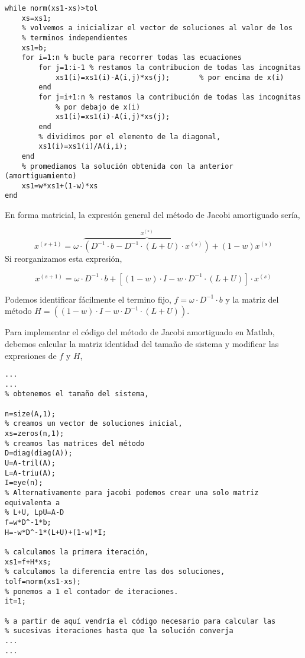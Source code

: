 \begin{lstlisting}
while norm(xs1-xs)>tol
 	xs=xs1;
    % volvemos a inicializar el vector de soluciones al valor de los
    % terminos independientes
    xs1=b; 
    for i=1:n % bucle para recorrer todas las ecuaciones
        for j=1:i-1 % restamos la contribucion de todas las incognitas
            xs1(i)=xs1(i)-A(i,j)*xs(j);       % por encima de x(i)
        end
        for j=i+1:n % restamos la contribución de todas las incognitas
            % por debajo de x(i)
            xs1(i)=xs1(i)-A(i,j)*xs(j);
        end
        % dividimos por el elemento de la diagonal,
        xs1(i)=xs1(i)/A(i,i);
    end
    % promediamos la solución obtenida con la anterior (amortiguamiento)
    xs1=w*xs1+(1-w)*xs
end
\end{lstlisting}

En forma matricial, la expresión general del método de Jacobi amortiguado sería,

\begin{equation*}
x^{(s+1)}=\omega\cdot\overbrace{\left(D^{-1}\cdot b- D^{-1}\cdot\left(L+U\right)\cdot x^{(s)}\right)}^{x^{(*)}}+(1-w)x^{(s)}
\end{equation*}
Si reorganizamos esta expresión,

\begin{equation*}
x^{(s+1)}=\omega\cdot D^{-1}\cdot b+ \left[(1-w)\cdot I - w\cdot  D^{-1}\cdot  \left(L+U \right)\right]\cdot x^{(s)}
\end{equation*}

Podemos identificar fácilmente el termino fijo, $f=\omega\cdot D^{-1}\cdot b$ y la matriz del método $H=\left((1-w)\cdot I - w\cdot  D^{-1}\cdot  \left(L+U \right)\right)$.

Para implementar el código del método de Jacobi amortiguado en Matlab, debemos calcular la matriz identidad del tamaño de sistema y modificar las expresiones de $f$ y $H$,

\begin{lstlisting}
...
...
% obtenemos el tamaño del sistema,

n=size(A,1);
% creamos un vector de soluciones inicial,
xs=zeros(n,1);
% creamos las matrices del método
D=diag(diag(A));
U=A-tril(A);
L=A-triu(A);
I=eye(n);
% Alternativamente para jacobi podemos crear una solo matriz equivalenta a
% L+U, LpU=A-D
f=w*D^-1*b;
H=-w*D^-1*(L+U)+(1-w)*I;

% calculamos la primera iteración,
xs1=f+H*xs;
% calculamos la diferencia entre las dos soluciones,
tolf=norm(xs1-xs);
% ponemos a 1 el contador de iteraciones.
it=1;

% a partir de aquí vendría el código necesario para calcular las
% sucesivas iteraciones hasta que la solución converja
...
...
\end{lstlisting}

